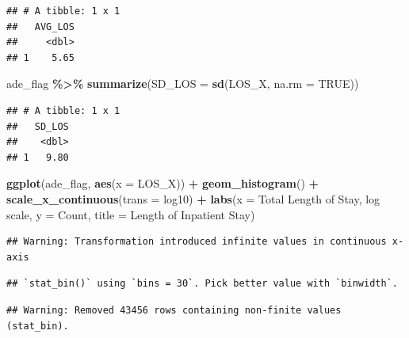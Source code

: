 \documentclass[preprint, 3p,
authoryear]{elsarticle} %
\newenvironment{Shaded}{\begin{snugshade}}{\end{snugshade}}
\newcommand{\DataTypeTok}[1]{\textcolor[rgb]{0.13,0.29,0.53}{#1}}
\newcommand{\KeywordTok}[1]{\textcolor[rgb]{0.13,0.29,0.53}{\textbf{#1}}}
\newcommand{\NormalTok}[1]{#1}
\newcommand{\OperatorTok}[1]{\textcolor[rgb]{0.81,0.36,0.00}{\textbf{#1}}}
\newcommand{\OtherTok}[1]{\textcolor[rgb]{0.56,0.35,0.01}{#1}}
\newcommand{\StringTok}[1]{\textcolor[rgb]{0.31,0.60,0.02}{#1}}
\begin{document}
\begin{verbatim}
## # A tibble: 1 x 1
##   AVG_LOS
##     <dbl>
## 1    5.65
\end{verbatim}

\begin{Shaded}
\begin{Highlighting}[]
\NormalTok{ade\_flag }\OperatorTok{\%\textgreater{}\%}
\StringTok{  }\KeywordTok{summarize}\NormalTok{(}\DataTypeTok{SD\_LOS =} \KeywordTok{sd}\NormalTok{(LOS\_X, }\DataTypeTok{na.rm =} \OtherTok{TRUE}\NormalTok{))}
\end{Highlighting}
\end{Shaded}

\begin{verbatim}
## # A tibble: 1 x 1
##   SD_LOS
##    <dbl>
## 1   9.80
\end{verbatim}

\begin{Shaded}
\begin{Highlighting}[]
\KeywordTok{ggplot}\NormalTok{(ade\_flag, }\KeywordTok{aes}\NormalTok{(}\DataTypeTok{x =}\NormalTok{ LOS\_X)) }\OperatorTok{+}
\StringTok{  }\KeywordTok{geom\_histogram}\NormalTok{() }\OperatorTok{+}
\StringTok{  }\KeywordTok{scale\_x\_continuous}\NormalTok{(}\DataTypeTok{trans =} \StringTok{\textquotesingle{}log10\textquotesingle{}}\NormalTok{) }\OperatorTok{+}
\StringTok{  }\KeywordTok{labs}\NormalTok{(}\DataTypeTok{x =} \StringTok{\textquotesingle{}Total Length of Stay, log scale\textquotesingle{}}\NormalTok{, }\DataTypeTok{y =} \StringTok{\textquotesingle{}Count\textquotesingle{}}\NormalTok{, }\DataTypeTok{title =} \StringTok{\textquotesingle{}Length of Inpatient Stay\textquotesingle{}}\NormalTok{)}
\end{Highlighting}
\end{Shaded}

\begin{verbatim}
## Warning: Transformation introduced infinite values in continuous x-axis
\end{verbatim}

\begin{verbatim}
## `stat_bin()` using `bins = 30`. Pick better value with `binwidth`.
\end{verbatim}

\begin{verbatim}
## Warning: Removed 43456 rows containing non-finite values (stat_bin).
\end{verbatim}
\end{document}

